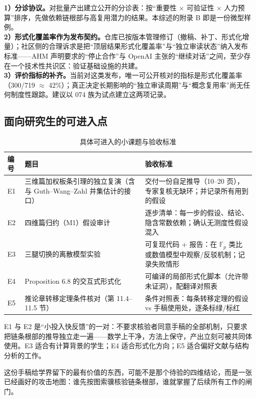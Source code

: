 \begin{dirbox}[工程流程轨道]
\textbf{1）分诊协议。}对批量产出建立公开的分诊表：按“重要性 × 可验证性 × 人力预算”排序，先做依赖链根部与高复用潜力的结果。本综述的附录 B 即是一份微型样例。\\
\textbf{2）形式化覆盖率作为发布契约。}仓库已按版本管理修订（撤稿、补丁、形式化增量）；社区侧的合理诉求是把“顶层结果形式化覆盖率”与“独立审读状态”纳入发布标准——AHM 声明要求的“停止合作”与 OpenAI 主张的“继续对话”之间，至少存在一个技术性共识区：验证基础设施的共建。\\
\textbf{3）评价指标的补齐。}当前对这类发布，唯一可公开核对的指标是形式化覆盖率（300/719 $\approx$ 42\%）；真正决定长期影响的“独立审读周期”与“概念复用率”尚无任何制度性跟踪。建议以 074 族为试点建立这两项记录。
\end{dirbox}

\subsection{面向研究生的可进入点}

\begin{table}[t]
\centering
\caption{具体可进入的小课题与验收标准}
\label{tab:entrypoints}
\footnotesize
\begin{tabularx}{\textwidth}{@{}L{0.6cm}L{4.6cm}Y@{}}
\toprule
{}\textbf{编号} & \textbf{题目} & \textbf{验收标准} \\
\midrule
E1 & 三维篇加权板条引理的独立复演（含与 Guth--Wang--Zahl 并集估计的接口） & 交付一份自足推导（10--20 页），专家复核无缺环；并记录所有用到的假设 \\
E2 & 四维篇归约（M1）假设审计 & 逐步清单：每一步的假设、结论、隐含常数依赖；确认无测度性假设混入 \\
E3 & 三腿切换的离散模型实验 & 可复现代码 + 报告：在 $\mathbb{F}_p$ 类比或数值模型中观察/反驳机制；记录失败情形 \\
E4 & Proposition 6.8 的交互式形式化 & 可编译的局部形式化脚本（允许带未证洞），配翻译对照表 \\
E5 & 推论章转移定理条件核对（第 11.4--11.5 节） & 条件对照表：每条转移定理的假设 vs 手稿使用处，逐条标绿/标红 \\
\bottomrule
\end{tabularx}
\end{table}

E1 与 E2 是“小投入快反馈”的一对：不要求核验者同意手稿的全部机制，只要求把链条根部的推导独立走一遍——数学上干净，方法上保守，产出立刻可被共同体使用。E3 适合有计算背景的学生；E4 适合形式化方向；E5 适合偏好文献与结构分析的工作。

\begin{keybox}[可记忆主句]
这份手稿给学界留下的最有价值的东西，可能不是那个待验的四维结论，而是一张已经画好的攻击地图：谁先按图索骥核验链条根部，谁就掌握了后续所有工作的闸门。
\end{keybox}